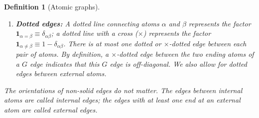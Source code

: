 \documentclass{article}
\newcommand{\1}{\mathds{1}}
\numberwithin{equation}{section}
\newcommand{\al}{\alpha}
\newcommand{\dashed}{\text{diffusive}}
\theoremstyle{plain} %
\newtheorem{definition}[theorem]{Definition}
\theoremstyle{remark}
\newcommand{\cor}{\color{red}}
\newcommand{\nc}{\normalcolor}
\newcommand{\Sdelta}{{\Sigma}_T}
\newcommand{\Sele}{{\mathcal E}}
\newcommand{\Selek}{{\mathcal E}}
\newcommand{\Seleinf}{{\mathcal E}^{\infty}}
\begin{document}
\begin{definition}[Atomic graphs]
\begin{itemize}
\begin{enumerate}
 


%
%
%



\item {\bf Dotted edges:} A dotted line connecting atoms $\al$ and $\beta$  represents the factor $\mathbf 1_{\al=\beta}\equiv \delta_{\al\beta}$; a dotted line with a cross ($\times$) represents the factor $\mathbf 1_{\al\ne \beta} \equiv  1-\delta_{\al\beta} $. There is at most one dotted or $\times$-dotted edge between each pair of atoms. %
By definition, a $\times$-dotted edge between the two ending atoms of a $G$ edge  indicates that this $G$ edge is off-diagonal. We also allow for dotted edges between external atoms.   
\end{enumerate}
The orientations of non-solid edges do not matter. The edges between internal atoms are called \emph{internal edges};  the edges with at least one end at an external atom are called \emph{external edges}. 



\end{itemize}
\end{definition}
\end{document}
